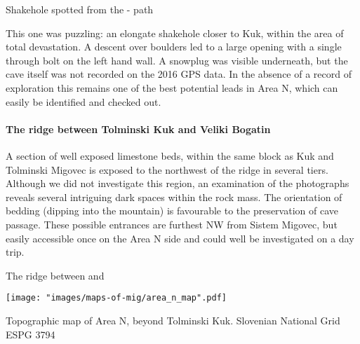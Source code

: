     \begin{marginfigure}
\centering
{} 
 \caption{Shakehole spotted from the  - \protect{} path }\label{shakehole next to kuk}
\end{marginfigure}

This one was puzzling: an elongate shakehole closer to Kuk, within the area of total devastation. A descent over boulders led to a large opening with a single through bolt on the left hand wall. A snowplug was visible underneath, but the cave itself was not recorded on the 2016 GPS data. In the absence of a record of exploration this remains one of the best potential leads in Area N, which can easily be identified and checked out.

\paragraph{The ridge between Tolminski Kuk and Veliki Bogatin}

A section of well exposed limestone beds, within the same block as Kuk and Tolminski Migovec is exposed to the northwest of the ridge in several tiers. Although we did not investigate this region, an examination of the photographs reveals several intriguing dark spaces within the rock mass. The orientation of bedding (dipping into the mountain) is favourable to the preservation of cave passage.  These possible entrances are furthest NW from Sistem Migovec, but easily accessible once on the Area N side and could well be investigated on a day trip.

\begin{pagefigure}
\checkoddpage \ifoddpage \forcerectofloat \else \forceversofloat \fi
    \caption{ The ridge between \protect{} and \protect{} }
\end{pagefigure}


 \begin{pagemap}
 \checkoddpage \ifoddpage \forcerectofloat \else \forceversofloat \fi
\centering
  \texttt{[image: "images/maps-of-mig/area\_n\_map".pdf]}
  
  \caption{Topographic map of Area N, beyond Tolminski Kuk. Slovenian National Grid ESPG 3794}
  \label{map:map area n}
 \end{pagemap}
